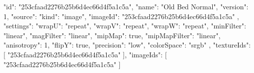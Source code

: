 {
  "id": "253cfaad2276b25b6d4ec66d4f5a1c5a",
  "name": "Old Bed Normal",
  "version": 1,
  "source": {
    "kind": "image",
    "imageId": "253cfaad2276b25b6d4ec66d4f5a1c5a"
  },
  "settings": {
    "wrapU": "repeat",
    "wrapV": "repeat",
    "wrapW": "repeat",
    "minFilter": "linear",
    "magFilter": "linear",
    "mipMap": true,
    "mipMapFilter": "linear",
    "anisotropy": 1,
    "flipY": true,
    "precision": "low",
    "colorSpace": "srgb"
  },
  "textureIds": [
    "253cfaad2276b25b6d4ec66d4f5a1c5a"
  ],
  "imageIds": [
    "253cfaad2276b25b6d4ec66d4f5a1c5a"
  ]
}
